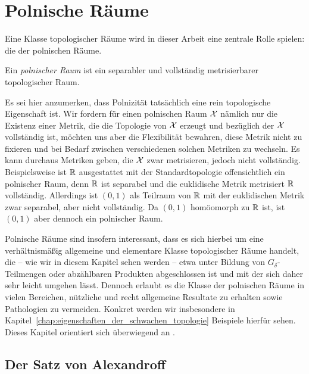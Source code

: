 \documentclass[../thesis/thesis.tex]{subfiles}
\begin{document}
	
	\chapter{Polnische Räume}
	\label{chap:polnische_räume}
	
	Eine Klasse topologischer Räume wird in dieser Arbeit eine zentrale Rolle spielen: die der polnischen Räume.
	
	\begin{Definition}
		Ein \emph{polnischer Raum} ist ein separabler und vollständig metrisierbarer topologischer Raum.
	\end{Definition}

	\begin{Bemerkung}
		Es sei hier anzumerken, dass Polnizität tatsächlich eine rein topologische Eigenschaft ist. Wir fordern für einen polnischen Raum $\mathcal{X}$ nämlich nur die Existenz einer Metrik,
		die die Topologie von $\mathcal{X}$ erzeugt und bezüglich der $\mathcal{X}$ vollständig ist, möchten uns aber die Flexibilität
		bewahren, diese Metrik nicht zu fixieren und bei Bedarf zwischen verschiedenen solchen Metriken
		zu wechseln. Es kann durchaus Metriken geben, die $\mathcal{X}$ zwar metrisieren, jedoch nicht vollständig.
		Beispielsweise ist $\mathbb{R}$ ausgestattet mit der Standardtopologie offensichtlich ein polnischer Raum,
		denn $\mathbb{R}$ ist separabel und die euklidische Metrik metrisiert $\mathbb{R}$ vollständig. 
		Allerdings ist $(0, 1)$ als Teilraum von $\mathbb{R}$ mit der euklidischen Metrik zwar separabel, aber nicht vollständig.
		Da $(0, 1)$ homöomorph zu $\mathbb{R}$ ist, ist $(0, 1)$ aber dennoch ein polnischer Raum.
	\end{Bemerkung}

	Polnische Räume sind insofern interessant, dass es sich hierbei um eine verhältnismäßig allgemeine und elementare Klasse topologischer Räume handelt, die -- wie wir in diesem Kapitel sehen werden -- 
	etwa unter Bildung von $G_\delta$-Teilmengen oder abzählbaren Produkten abgeschlossen ist und mit der sich daher sehr leicht umgehen lässt. Dennoch erlaubt es die Klasse der polnischen Räume in vielen Bereichen, 
	nützliche und recht allgemeine Resultate zu erhalten sowie Pathologien zu vermeiden. Konkret werden wir insbesondere in Kapitel~\ref{chap:eigenschaften_der_schwachen_topologie} Beispiele hierfür sehen.
	Dieses Kapitel orientiert sich überwiegend an \cite[Section 4.14]{Simon.2015}. 
	
	\section{Der Satz von Alexandroff}
	
\end{document}
